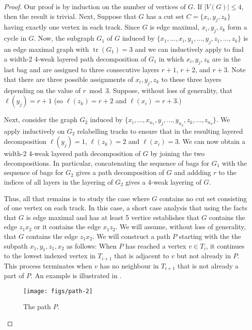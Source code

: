 \documentclass{patmorin}
\DeclareMathOperator{\tr}{tr}
\begin{document}
\begin{proof}
  Our proof is by induction on the number of vertices of $G$.  If
  $|V(G)|\le 4$, then the result is trivial.  Next, Suppose that $G$ has
  a cut set $C=\{x_i,y_j,z_k\}$ having exactly one vertex in each track.
  Since $G$ is edge maximal, $x_i,y_j,z_k$ form a cycle in $G$.  Now,
  the subgraph $G_1$ of $G$ induced by $\{x_1,\ldots,x_i, y_1,\ldots,y_j,
  z_1,\ldots,z_k\}$ is an edge maximal graph with $\tr(G_1)=3$ and we
  can inductively apply  to find a width-2 4-weak layered
  path decomposition of $G_1$ in which $x_i,y_j,z_k$ are in the last bag
  and are assigned to three consecutive layers $r+1$, $r+2$, and $r+3$.
  Note that there are three possible assignments of $x_i,y_j,z_k$ to
  these three layers depending on the value of $r\bmod 3$.  Suppose,
  without loss of generality, that $\ell(y_j)=r+1$ (so $\ell(z_k)=r+2$
  and $\ell(x_i)=r+3$.)

  Next, consider the graph $G_2$ induced by
  $\{x_i,\ldots,x_{n_1},y_j,\ldots,y_{n_2},z_k,\ldots,z_{n_3}\}$.
  We apply  inductively on $G_2$ relabelling tracks to
  ensure that in the resulting layered decomposition $\ell(y_j)=1$,
  $\ell(z_k)=2$ and $\ell(x_i)=3$.   We can now obtain a width-2 4-weak
  layered path decomposition of $G$ by joining the two decompositions.
  In particular,  concatenating the sequence of bags for $G_1$ with
  the sequence of bags for $G_2$ gives a path decomposition of $G$
  and addding $r$ to the indices of all layers in the layering of $G_2$
  gives a 4-weak layering of $G$.

  Thus, all that remains is to study the case where $G$ contains no cut
  set consisting of one vertex on each track.  In this case, a short
  case analysis that using the facts that $G$ is edge maximal and has at
  least 5 vertice establishes that $G$ contains the edge $z_1x_2$ or it
  contains the edge $x_1z_2$.  We will assume, without loss of generality,
  that $G$ contains the edge $z_1x_2$.  We will construct a path $P$
  starting with the the subpath $x_1,y_1,z_1,x_2$ as follows: When $P$
  has reached a vertex $v\in T_i$, it continues to the lowest indexed
  vertex in $T_{i+1}$ that is adjacent to $v$ but not already in $P$. This
  process terminates when $v$ has no neighbour in $T_{i+1}$ that is not
  already a part of $P$.  An example is illustrated in .

  \begin{figure}
     \begin{center}
        \texttt{[image: figs/path-2]}
     \end{center}
     \caption{The path $P$.}
  \end{figure}


\end{proof}
\end{document}
